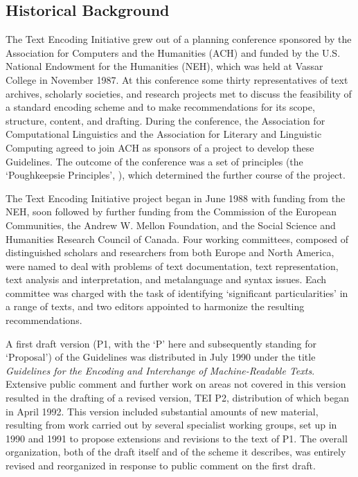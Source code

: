 \subsection[{Historical Background}]{Historical Background}\label{ABTEI}\par
The Text Encoding Initiative grew out of a planning conference sponsored by the Association for Computers and the Humanities (ACH) and funded by the U.S. National Endowment for the Humanities (NEH), which was held at Vassar College in November 1987. At this conference some thirty representatives of text archives, scholarly societies, and research projects met to discuss the feasibility of a standard encoding scheme and to make recommendations for its scope, structure, content, and drafting. During the conference, the Association for Computational Linguistics and the Association for Literary and Linguistic Computing agreed to join ACH as sponsors of a project to develop these Guidelines. The outcome of the conference was a set of principles (the ‘Poughkeepsie Principles’, \cite{AB-eg-01}), which determined the further course of the project.\par
The Text Encoding Initiative project began in June 1988 with funding from the NEH, soon followed by further funding from the Commission of the European Communities, the Andrew W. Mellon Foundation, and the Social Science and Humanities Research Council of Canada. Four working committees, composed of distinguished scholars and researchers from both Europe and North America, were named to deal with problems of text documentation,  text representation, text analysis and interpretation,  and metalanguage and syntax issues.  Each committee was charged with the task of identifying ‘significant particularities’ in a range of texts, and two editors appointed to harmonize the resulting recommendations.\par
A first draft version (P1, with the ‘P’ here and subsequently standing for ‘Proposal’) of the Guidelines was distributed in July 1990 under the title \textit{Guidelines for the Encoding and Interchange of Machine-Readable Texts}.  Extensive public comment and further work on areas not covered in this version resulted in the drafting of a revised version, TEI P2, distribution of which began in April 1992. This version included substantial amounts of new material, resulting from work carried out by several specialist working groups, set up in 1990 and 1991 to propose extensions and revisions to the text of P1. The overall organization, both of the draft itself and of the scheme it describes, was entirely revised and reorganized in response to public comment on the first draft.\par
